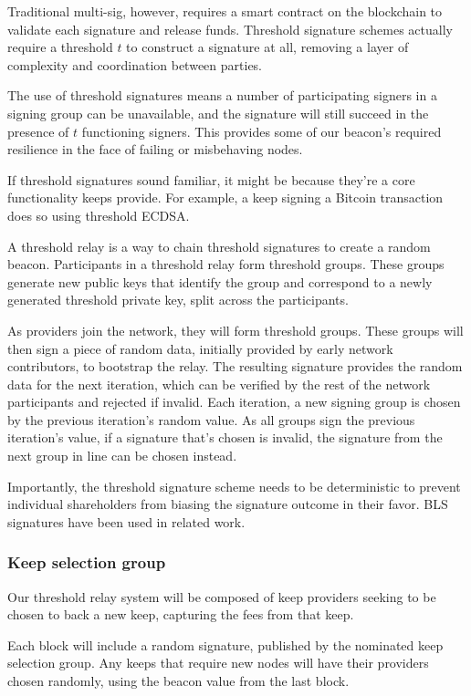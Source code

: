 \documentclass[11pt]{article}
\begin{document}
Traditional multi-sig, however, requires a smart contract on the
blockchain to validate each signature and release funds. Threshold
signature schemes actually require a threshold $t$ to construct a
signature at all, removing a layer of complexity and coordination
between parties.

The use of threshold signatures means a number of participating
signers in a signing group can be unavailable, and the signature will
still succeed in the presence of $t$ functioning signers. This
provides some of our beacon's required resilience in the face of
failing or misbehaving nodes.

If threshold signatures sound familiar, it might be because they're a
core functionality keeps provide. For example, a keep signing a
Bitcoin transaction does so using threshold ECDSA.

A threshold relay is a way to chain threshold signatures to create a
random beacon. Participants in a threshold relay form threshold
groups. These groups generate new public keys that identify the group
and correspond to a newly generated threshold private key, split
across the participants.

As providers join the network, they will form threshold groups. These
groups will then sign a piece of random data, initially provided by
early network contributors, to bootstrap the relay. The resulting
signature provides the random data for the next iteration, which can
be verified by the rest of the network participants and rejected if
invalid. Each iteration, a new signing group is chosen by the previous
iteration's random value. As all groups sign the previous iteration's
value, if a signature that's chosen is invalid, the signature from the
next group in line can be chosen instead.

Importantly, the threshold signature scheme needs to be deterministic
to prevent individual shareholders from biasing the signature outcome
in their favor. BLS signatures \cite{BLS} have been used in related
work.

\subsubsection{Keep selection group}

Our threshold relay system will be composed of keep providers seeking
to be chosen to back a new keep, capturing the fees from that keep.

Each block will include a random signature, published by the nominated
keep selection group. Any keeps that require new nodes will have their
providers chosen randomly, using the beacon value from the last block.
\end{document}

